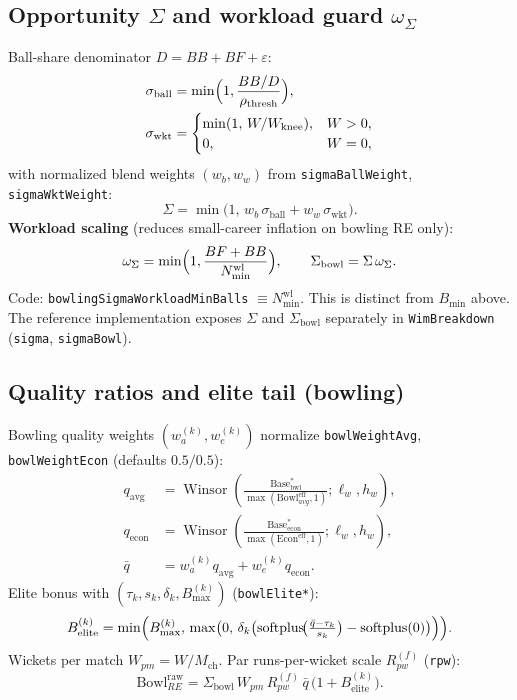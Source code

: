 \documentclass[12pt,a4paper]{article}
\newcommand{\winsor}{\operatorname{Winsor}}
\newcommand{\softplus}{\operatorname{softplus}}
\begin{document}
\subsection{Opportunity $\Sigma$ and workload guard $\omega_\Sigma$}
Ball-share denominator $D = BB+BF+\varepsilon$:
\begin{align}
  \sigma_{\mathrm{ball}} &= \min\Bigl(1,\frac{BB/D}{\rho_{\mathrm{thresh}}}\Bigr), \\
  \sigma_{\mathrm{wkt}} &=
  \begin{cases}
    \min(1,\,W/W_{\mathrm{knee}}), & W>0,\\
    0, & W=0,
  \end{cases}
\end{align}
with normalized blend weights $(w_b,w_w)$ from \texttt{sigmaBallWeight}, \texttt{sigmaWktWeight}:
\begin{equation}
  \Sigma = \min\bigl(1,\,w_b\,\sigma_{\mathrm{ball}} + w_w\,\sigma_{\mathrm{wkt}}\bigr).
\end{equation}
\textbf{Workload scaling} (reduces small-career inflation on bowling RE only):
\begin{equation}
  \omega_\Sigma = \min\Bigl(1,\frac{BF+BB}{N_{\min}^{\mathrm{wl}}}\Bigr),
  \qquad
  \Sigma_{\mathrm{bowl}} = \Sigma\,\omega_\Sigma.
\end{equation}
Code: \texttt{bowlingSigmaWorkloadMinBalls} $\equiv N_{\min}^{\mathrm{wl}}$. This is distinct from $B_{\min}$ above. The reference implementation exposes $\Sigma$ and $\Sigma_{\mathrm{bowl}}$ separately in \texttt{WimBreakdown} (\texttt{sigma}, \texttt{sigmaBowl}).

\subsection{Quality ratios and elite tail (bowling)}
Bowling quality weights $(w_a^{(k)},w_e^{(k)})$ normalize \texttt{bowlWeightAvg}, \texttt{bowlWeightEcon} (defaults $0.5/0.5$):
\begin{align}
  q_{\mathrm{avg}} &= \winsor\!\left(\frac{\mathrm{Base}^\ast_{\mathrm{bwl}}}{\max(\mathrm{Bowl}^{\mathrm{eff}}_{avg},1)};\ell_w,h_w\right), \\
  q_{\mathrm{econ}} &= \winsor\!\left(\frac{\mathrm{Base}^\ast_{\mathrm{econ}}}{\max(\mathrm{Econ}^{\mathrm{eff}},1)};\ell_w,h_w\right), \\
  \bar q &= w_a^{(k)} q_{\mathrm{avg}} + w_e^{(k)} q_{\mathrm{econ}}.
\end{align}
Elite bonus with $(\tau_k,s_k,\delta_k,B_{\max}^{(k)})$ (\texttt{bowlElite*}):
\begin{equation}
  B_{\mathrm{elite}}^{(k)}
  = \min\Bigl(B_{\max}^{(k)},\,\max\bigl(0,\,\delta_k\bigl(\softplus\!\bigl(\tfrac{\bar q-\tau_k}{s_k}\bigr)-\softplus(0)\bigr)\Bigr)\Bigr).
\end{equation}
Wickets per match $W_{pm}=W/M_{\mathrm{ch}}$. Par runs-per-wicket scale $R_{pw}^{(f)}$ (\texttt{rpw}):
\begin{equation}
  \mathrm{Bowl}_{RE}^{\mathrm{raw}}
  = \Sigma_{\mathrm{bowl}}\,W_{pm}\,R_{pw}^{(f)}\,\bar q\,\bigl(1+B_{\mathrm{elite}}^{(k)}\bigr).
\end{equation}
\end{document}
